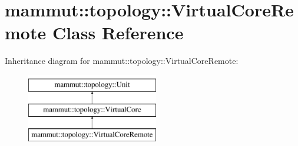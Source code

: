 \hypertarget{classmammut_1_1topology_1_1VirtualCoreRemote}{\section{mammut\-:\-:topology\-:\-:Virtual\-Core\-Remote Class Reference}
\label{classmammut_1_1topology_1_1VirtualCoreRemote}
}
Inheritance diagram for mammut\-:\-:topology\-:\-:Virtual\-Core\-Remote\-:\begin{figure}[H]
\begin{center}
\leavevmode
\includegraphics[height=3.000000cm]{classmammut_1_1topology_1_1VirtualCoreRemote}
\end{center}
\end{figure}
